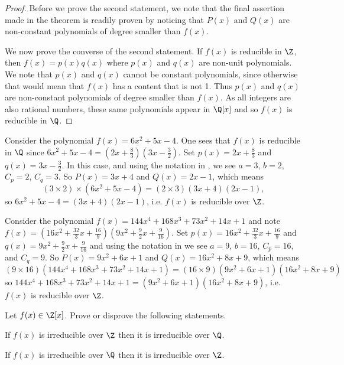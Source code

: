 \begin{proof}
    Before we prove the second statement, we note that the final assertion made in the theorem is readily proven by noticing that $P(x)$ and $Q(x)$ are non-constant polynomials of degree smaller than $f(x)$.

    We now prove the converse of the second statement. If $f(x)$ is reducible in $\Z$, then $f(x) = p(x)q(x)$ where $p(x)$ and $q(x)$ are non-unit polynomials. We note that $p(x)$ and $q(x)$ cannot be constant polynomials, since otherwise that would mean that $f(x)$ has a content that is not 1. Thus $p(x)$ and $q(x)$ are non-constant polynomials of degree smaller than $f(x)$. As all integers are also rational numbers, these same polynomials appear in $\Q[x]$ and so $f(x)$ is reducible in $\Q$.
\end{proof}

\begin{example}
    Consider the polynomial $f(x) = 6x^2 + 5x - 4$. One sees that $f(x)$ is reducible in $\Q$ since $6x^2 + 5x - 4 = \left(2x + \frac83\right)\left(3x - \frac32\right)$. Set $p(x) = 2x + \frac83$ and $q(x) = 3x - \frac32$. In this case, and using the notation in , we see $a = 3$, $b = 2$, $C_p = 2$, $C_q = 3$. So $P(x) = 3x + 4$ and $Q(x) = 2x - 1$, which means
    \[
        (3\times2)\times (6x^2 + 5x - 4) = (2\times3)(3x+4)(2x-1),
    \]
    so $6x^2 + 5x - 4 = (3x+4)(2x-1)$, i.e. $f(x)$ is reducible over $\Z$.
\end{example}

\begin{example}
    Consider the polynomial $f(x) = 144x^4 + 168x^3 + 73x^2 + 14x + 1$ and note $f(x) = \left(16x^2 + \frac{32}3x + \frac{16}9\right)\left(9x^2 + \frac92x + \frac9{16}\right)$. Set $p(x) = 16x^2 + \frac{32}3x + \frac{16}9$ and $q(x) = 9x^2 + \frac92x + \frac9{16}$ and using the notation in  we see $a = 9$, $b = 16$, $C_p = 16$, and $C_q = 9$. So $P(x) = 9x^2+6x+1$ and $Q(x) = 16x^2 + 8x + 9$, which means
    \[
        (9 \times 16)\left(144x^4 + 168x^3 + 73x^2 + 14x + 1\right) = (16 \times 9)(9x^2+6x+1)(16x^2 + 8x + 9)
    \]
    so $144x^4 + 168x^3 + 73x^2 + 14x + 1 = (9x^2+6x+1)(16x^2 + 8x + 9)$, i.e. $f(x)$ is reducible over $\Z$.
\end{example}

\begin{exercise}
    Let $f(x) \in \Z[x]$. Prove or disprove the following statements.
    \begin{partquestions}{\alph*}
        \item If $f(x)$ is irreducible over $\Z$ then it is irreducible over $\Q$.
        \item If $f(x)$ is irreducible over $\Q$ then it is irreducible over $\Z$.
    \end{partquestions}
\end{exercise}

